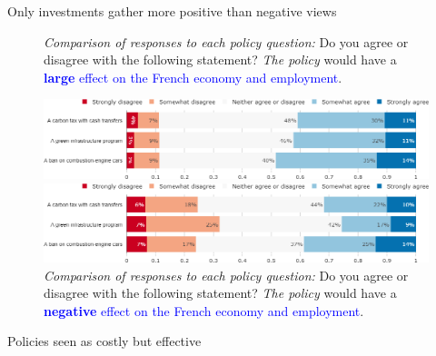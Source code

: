 \begin{framefont}{\small}
\begin{frame}{Only investments gather more positive than negative views}%
\begin{figure}[h!]
\centering
\caption{\textit{Comparison of responses to each policy question:} Do you agree or disagree with the following statement? \textit{The policy} would have a \textcolor{blue}{\textbf{large} effect on the French economy and employment}.}
\includegraphics[width=.78\paperwidth]{../figures/FR/policies_large_effect_FR.png}
\vspace{-.1cm}
\centering
\caption{\textit{Comparison of responses to each policy question:} Do you agree or disagree with the following statement? \textit{The policy} would have a \textcolor{blue}{\textbf{negative} effect on the French economy and employment}.}
\includegraphics[width=.78\paperwidth]{../figures/FR/policies_negative_effect_FR.png}
\end{figure}
\end{frame}

\begin{frame}{Policies seen as costly but effective}%


\end{frame}
\end{framefont}
